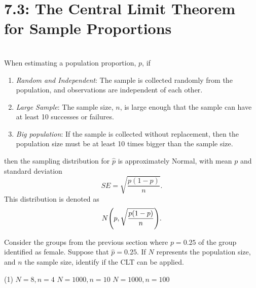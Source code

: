 \documentclass[../mathNotesPreamble]{subfiles}
\begin{document}
  \section{7.3: The Central Limit Theorem for Sample Proportions}
  \begin{defn*}\mbox{}\\
    When estimating a population proportion, $p$, if
    \begin{enumerate}
      \item \emph{Random and Independent}: The sample is collected randomly from the population, and observations are independent of each other.
      \item \emph{Large Sample}: The sample size, $n$, is large enough that the sample can have at least 10 successes or failures.
      \item \emph{Big population}: If the sample is collected without replacement, then the population size must be at least 10 times bigger than the sample size.
    \end{enumerate}
    then the sampling distribution for $\hat{p}$ is approximately Normal, with mean $p$ and standard deviation
      \[SE=\sqrt{\frac{p(1-p)}{n}}.\]
    This distribution is denoted as
      \[N{\left(p,\sqrt{\frac{p(1-p)}{n}}\right)}.\]
  \end{defn*}
  \pagebreak
  
  \begin{ex*}
    Consider the groups from the previous section where $p=0.25$ of the group identified as female. Suppose that $\hat{p}=0.25$. If $N$ represents the population size, and $n$ the sample size, identify if the CLT can be applied.
  \end{ex*}
  \begin{extasks}[after-item-skip=\stretch{1}](1)
    \task $N=8, n=4$
    \task $N=1000, n=10$
    \task $N=1000, n=100$
  \end{extasks}
  \pagebreak
  
\end{document}
